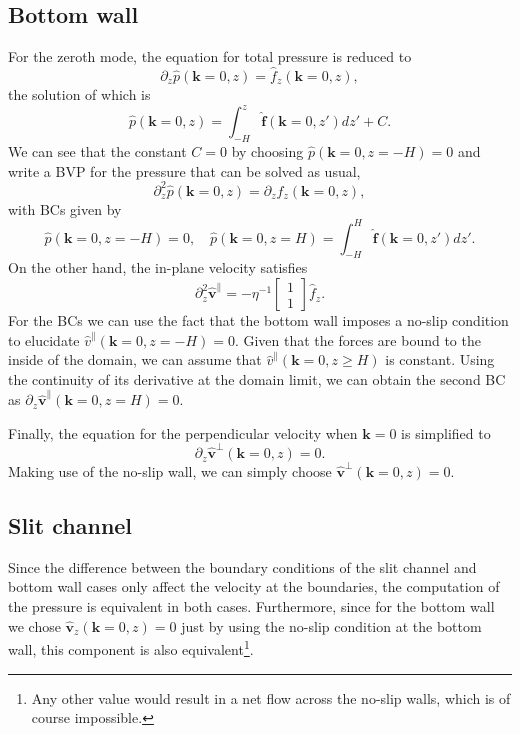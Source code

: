 \documentclass[twoside,openright,titlepage,numbers=noenddot,%
headinclude,footinclude,cleardoublepage=empty,abstract=on,
BCOR=5mm,fontsize=11pt, dvipsnames, paper=b5
]{scrreprt}
\renewcommand{\vec}[1]{\bm{#1}}
\newcommand{\fou}[1]{\widehat{#1}}
\newcommand{\fvel}{v}
\begin{document}
\subsection*{Bottom wall}
For the zeroth mode, the equation for total pressure is reduced to
\begin{equation}
  \label{eq:dppressurebtm}
  \partial_z\fou{p}(\vec{k}=0, z) = \fou{f}_z(\vec{k} = 0, z),
\end{equation}
the solution of which is
\begin{equation}
  \fou{p}(\vec{k}=0, z) = \int_{-H}^z\fou{\vec{f}}(\vec{k} = 0, z')dz' + C.
\end{equation}
We can see that the constant $C=0$ by choosing $\fou{p}(\vec{k} =0, z=-H) = 0$ and write a \gls{BVP} for the pressure that can be solved as usual,
\begin{equation}
  \partial_z^2\fou{p}(\vec{k} = 0, z) = \partial_zf_z(\vec{k}=0, z),
\end{equation}
with \glspl{BC} given by
\begin{equation}
  \fou{p}(\vec{k} = 0, z=-H) = 0, \quad \fou{p}(\vec{k} = 0, z=H) = \int_{-H}^H\fou{\vec{f}}(\vec{k} = 0, z')dz'.
\end{equation}
On the other hand, the in-plane velocity satisfies
\begin{equation}
  \partial_z^2\fou{\vec{\fvel}}^{\parallel} = -\eta^{-1}
  \begin{bmatrix}
    1\\
    1
  \end{bmatrix}
  \fou{f}_z.
\end{equation}
For the \glspl{BC} we can use the fact that the bottom wall imposes a no-slip condition to elucidate $\fou{\fvel}^\parallel(\vec{k} = 0, z=-H) = 0$. Given that the forces are bound to the inside of the domain, we can assume that $\fou{\fvel}^\parallel(\vec{k} = 0, z\ge H)$ is constant. Using the continuity of its derivative at the domain limit, we can obtain the second \gls{BC} as $\partial_z\fou{\vec{\fvel}}^\parallel(\vec{k} = 0, z=H) = 0$.

Finally, the equation for the perpendicular velocity when $\vec{k} = 0$ is simplified to
\begin{equation}
  \partial_z\fou{\vec{\fvel}}^\perp(\vec{k} = 0, z) = 0.
\end{equation}
Making use of the no-slip wall, we can simply choose $\fou{\vec{\fvel}}^\perp(\vec{k} = 0, z) = 0$.

\subsection*{Slit channel}
Since the difference between the boundary conditions of the slit channel and bottom wall cases only affect the velocity at the boundaries, the computation of the pressure is equivalent in both cases.
Furthermore, since for the bottom wall we chose $\fou{\vec{\fvel}}_z(\vec{k}=0, z) =0$ just by using the no-slip condition at the bottom wall, this component is also equivalent\footnote{Any other value would result in a net flow across the no-slip walls, which is of course impossible.}.
\end{document}
